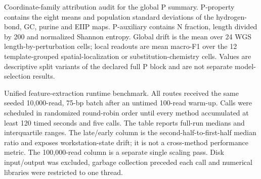 \documentclass[unnumsec,webpdf,modern,large,numbered]{oup-authoring-template}
\begin{document}
\begin{table}[!tbp]
\centering
\scriptsize
\caption{Coordinate-family attribution audit for the global P summary. P-property contains the eight means and population standard deviations of the hydrogen-bond, GC, purine and EIIP maps. P-auxiliary contains N fraction, length divided by 200 and normalized Shannon entropy. Global drift is the mean over 24 WGS length-by-perturbation cells; local readouts are mean macro-F1 over the 12 template-grouped spatial-localization or substitution-chemistry cells. Values are descriptive split variants of the declared full P block and are not separate model-selection results.}
\label{tab:supps10}

\end{table}

\begin{table}[!tbp]
\centering
\scriptsize
\caption{Unified feature-extraction runtime benchmark. All routes received the same seeded 10,000-read, 75-bp batch after an untimed 100-read warm-up. Calls were scheduled in randomized round-robin order until every method accumulated at least 120 timed seconds and five calls. The table reports full-run medians and interquartile ranges. The late/early column is the second-half-to-first-half median ratio and exposes workstation-state drift; it is not a cross-method performance metric. The 100,000-read column is a separate single scaling pass. Disk input/output was excluded, garbage collection preceded each call and numerical libraries were restricted to one thread.}
\label{tab:supps11}
\resizebox{\textwidth}{!}{}
\end{table}
\clearpage
\end{document}
